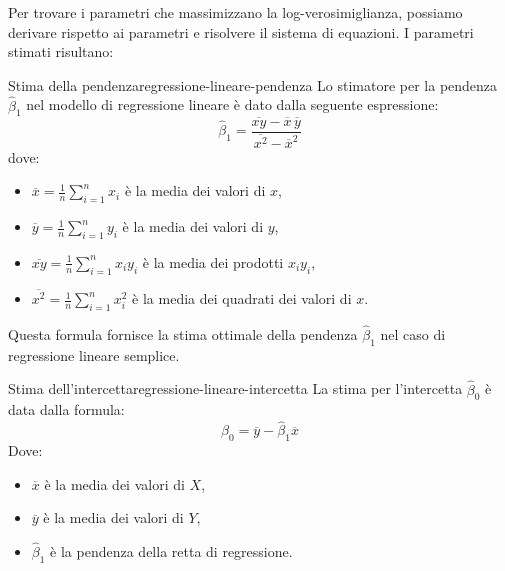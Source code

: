Per trovare i parametri che massimizzano la log-verosimiglianza, possiamo derivare rispetto ai parametri e risolvere il sistema di equazioni. I parametri stimati risultano:

\begin{definizione}[
    enhanced,
    overlay last={
        \node[anchor=south east, font=\large, text=cs@definition] at (frame.south east) {$\bigstar$};
    }
]{Stima della pendenza}{regressione-lineare-pendenza}
    Lo stimatore per la pendenza \( \hat{\beta}_1 \) nel modello di regressione lineare è dato dalla seguente espressione:
    \[
        \hat{\beta}_1 = \frac{\overline{xy} - \overline{x}\, \overline{y}}{\overline{x^2} - \overline{x}^2}
    \]
    dove:
    \begin{itemize}
        \item \( \overline{x} = \frac{1}{n} \sum_{i=1}^n x_i \) è la media dei valori di \( x \),
        \item \( \overline{y} = \frac{1}{n} \sum_{i=1}^n y_i \) è la media dei valori di \( y \),
        \item \( \overline{xy} = \frac{1}{n} \sum_{i=1}^n x_i y_i \) è la media dei prodotti \( x_i y_i \),
        \item \( \overline{x^{2}} = \frac{1}{n} \sum_{i=1}^n x_i^2 \) è la media dei quadrati dei valori di \( x \).
    \end{itemize}
\end{definizione}
Questa formula fornisce la stima ottimale della pendenza \( \hat{\beta}_1 \) nel
caso di regressione lineare semplice.

\begin{definizione}[
    enhanced,
    overlay last={
        \node[anchor=south east, font=\large, text=cs@definition] at (frame.south east) {$\bigstar$};
    }
]{Stima dell'intercetta}{regressione-lineare-intercetta}
    La stima per l'intercetta \( \hat{\beta}_0 \) è data dalla formula:
    \[
        \hat{\beta}_0 = \overline{y} - \hat{\beta}_1 \overline{x}
    \]
    Dove:
    \begin{itemize}
        \item \( \overline{x} \) è la media dei valori di \( X \),
        \item \( \overline{y} \) è la media dei valori di \( Y \),
        \item \( \hat{\beta}_1 \) è la pendenza della retta di regressione.
    \end{itemize}
\end{definizione}

